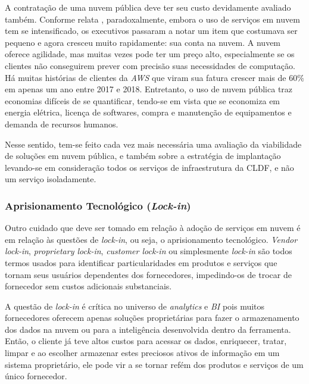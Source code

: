     A contratação de uma nuvem pública deve ter seu custo devidamente avaliado também. Conforme relata \cite{mattturck:trends}, paradoxalmente, embora o uso de serviços em nuvem tem se intensificado, os executivos passaram a notar um item que costumava ser pequeno e agora cresceu muito rapidamente: sua conta na nuvem. A nuvem oferece agilidade, mas muitas vezes pode ter um preço alto, especialmente se os clientes não conseguirem prever com precisão suas necessidades de computação. Há muitas histórias de clientes da \emph{AWS} que viram sua fatura crescer mais de $60\%$  em apenas um ano entre 2017 e 2018. Entretanto, o uso de nuvem pública traz economias difíceis de se quantificar, tendo-se em vista que se economiza em energia elétrica, licença de softwares, compra e manutenção de equipamentos e demanda de recursos humanos.
    
    Nesse sentido, tem-se feito cada vez mais necessária uma avaliação da viabilidade de soluções em nuvem pública, e também sobre a estratégia de implantação levando-se em consideração todos os serviços de infraestrutura da CLDF, e não um serviço isoladamente.
    
    \subsubsection*{Aprisionamento Tecnológico (\emph{Lock-in})}
    
    
    Outro cuidado que deve ser tomado em relação à adoção de serviços em nuvem é em relação às questões de \emph{lock-in}, ou seja, o aprisionamento tecnológico. \emph{Vendor lock-in}, \emph{proprietary lock-in}, \emph{customer lock-in} ou simplesmente \emph{lock-in} são todos termos usados para identificar particularidades em produtos e serviços que tornam seus usuários dependentes dos fornecedores, impedindo-os de trocar de fornecedor sem custos adicionais substanciais. 
    
    A questão de \emph{lock-in} é crítica no universo de \emph{analytics} e \emph{BI} pois muitos fornecedores oferecem apenas soluções proprietárias para fazer o armazenamento dos dados na nuvem ou para a inteligência desenvolvida dentro da ferramenta. Então, o cliente já teve altos custos para acessar os dados, enriquecer, tratar, limpar e ao escolher armazenar estes preciosos ativos de informação em um sistema proprietário, ele pode vir a se tornar refém dos produtos e serviços de um único fornecedor. 
    
